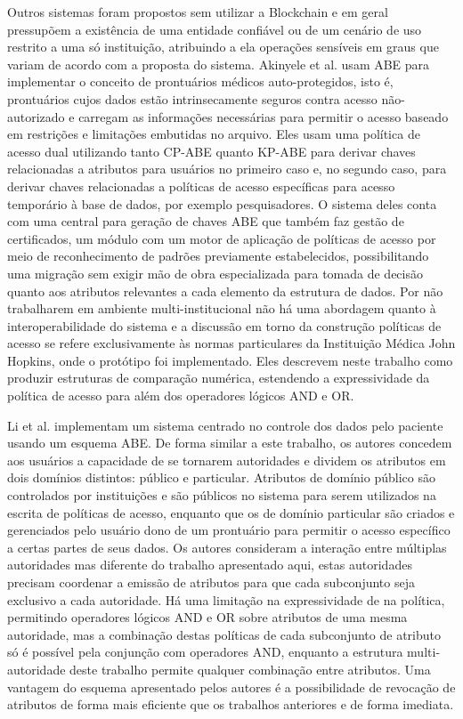 \documentclass[a4paper,11pt]{article}
\begin{document}
Outros sistemas foram propostos sem utilizar a Blockchain e em geral pressupõem a existência de uma entidade confiável ou de um cenário de uso restrito a uma só instituição, atribuindo a ela operações sensíveis em graus que variam de acordo com a proposta do sistema.
Akinyele et al. \cite{Akinyele2010} usam ABE para implementar o conceito de prontuários médicos auto-protegidos, isto é, prontuários cujos dados estão intrinsecamente seguros contra acesso não-autorizado e carregam as informações necessárias para permitir o acesso baseado em restrições e limitações embutidas no arquivo.
Eles usam uma política de acesso dual utilizando tanto CP-ABE quanto KP-ABE para derivar chaves relacionadas a atributos para usuários no primeiro caso e, no segundo caso, para derivar chaves relacionadas a políticas de acesso específicas para acesso temporário à base de dados, por exemplo pesquisadores.
O sistema deles conta com uma central para geração de chaves ABE que também faz gestão de certificados, um módulo com um motor de aplicação de políticas de acesso por meio de reconhecimento de padrões previamente estabelecidos, possibilitando uma migração sem exigir mão de obra especializada para tomada de decisão quanto aos atributos relevantes a cada elemento da estrutura de dados.
Por não trabalharem em ambiente multi-institucional não há uma abordagem quanto à interoperabilidade do sistema e a discussão em torno da construção políticas de acesso se refere exclusivamente às normas particulares da Instituição Médica John Hopkins, onde o protótipo foi implementado.
Eles descrevem neste trabalho como produzir estruturas de comparação numérica, estendendo a expressividade da política de acesso para além dos operadores lógicos AND e OR.

Li et al. \cite{Li2013} implementam um sistema centrado no controle dos dados pelo paciente usando um esquema ABE.
De forma similar a este trabalho, os autores concedem aos usuários a capacidade de se tornarem autoridades e dividem os atributos em dois domínios distintos: público e particular.
Atributos de domínio público são controlados por instituições e são públicos no sistema para serem utilizados na escrita de políticas de acesso, enquanto que os de domínio particular são criados e gerenciados pelo usuário dono de um prontuário para permitir o acesso específico a certas partes de seus dados.
Os autores consideram a interação entre múltiplas autoridades mas diferente do trabalho apresentado aqui, estas autoridades precisam coordenar a emissão de atributos para que cada subconjunto seja exclusivo a cada autoridade.
Há uma limitação na expressividade de na política, permitindo operadores lógicos AND e OR sobre atributos de uma mesma autoridade, mas a combinação destas políticas de cada subconjunto de atributo só é possível pela conjunção com operadores AND, enquanto a estrutura multi-autoridade deste trabalho permite qualquer combinação entre atributos.
Uma vantagem do esquema apresentado pelos autores é a possibilidade de revocação de atributos de forma mais eficiente que os trabalhos anteriores e de forma imediata.
\end{document}

